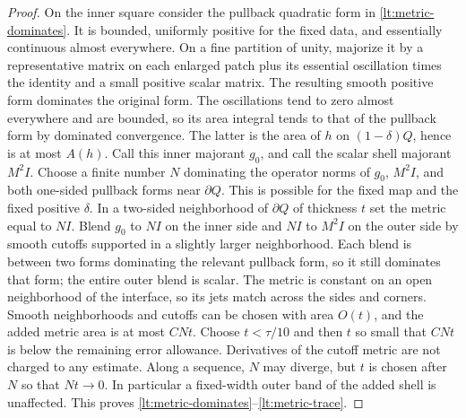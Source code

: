 \documentclass[11pt]{article}
\numberwithin{equation}{section}
\theoremstyle{definition}
\theoremstyle{remark}
\begin{document}
\begin{proof}
On the inner square consider the pullback quadratic form in
\eqref{lt:metric-dominates}.  It is bounded, uniformly positive for the
fixed data, and essentially continuous almost everywhere.  On a fine
partition of unity, majorize it by a representative matrix on each
enlarged patch plus its essential oscillation times the identity and a
small positive scalar matrix.  The resulting smooth positive form
dominates the original form.  The oscillations tend to zero almost
everywhere and are bounded, so its area integral tends to that of the
pullback form by dominated convergence.  The latter is the area of
$h$ on $(1-\delta)Q$, hence is at most $A(h)$.  Call this inner majorant $g_0$, and call the scalar shell
majorant $M^2I$.  Choose a finite number $N$ dominating the operator
norms of $g_0$, $M^2I$, and both one-sided pullback forms near
$\partial Q$.  This is possible for the fixed map and the fixed
positive $\delta$.  In a two-sided neighborhood of $\partial Q$ of
thickness $t$ set the metric equal to $NI$.  Blend $g_0$ to $NI$
on the inner side and $NI$ to $M^2I$ on the outer side by smooth
cutoffs supported in a slightly larger neighborhood.  Each blend is
between two forms dominating the relevant pullback form, so it still
dominates that form; the entire outer blend is scalar.  The metric
is constant on an open neighborhood of the interface, so its jets
match across the sides and corners.  Smooth neighborhoods and cutoffs
can be chosen with area $O(t)$, and the added metric area is at most
$CNt$.  Choose $t<\tau/10$ and then $t$ so small that $CNt$ is below
the remaining error allowance.  Derivatives of the cutoff metric
are not charged to any estimate.  Along a sequence, $N$ may diverge,
but $t$ is chosen after $N$ so that $Nt\to0$.  In particular a
fixed-width outer band of the added shell is unaffected.  This proves \eqref{lt:metric-dominates}--\eqref{lt:metric-trace}.


\end{proof}
\end{document}
